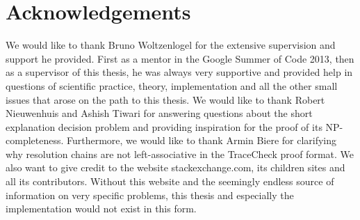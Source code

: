 \chapter*{Acknowledgements}
\vspace*{\fill}

We would like to thank Bruno Woltzenlogel for the extensive supervision and support he provided.
First as a mentor in the Google Summer of Code 2013, then as a supervisor of this thesis, he was always very supportive and provided help in questions of scientific practice, theory, implementation and all the other small issues that arose on the path to this thesis.
We would like to thank Robert Nieuwenhuis and Ashish Tiwari for answering questions about the short explanation decision problem and providing inspiration for the proof of its NP-completeness. Furthermore, we would like to thank Armin Biere for clarifying why resolution chains are not left-associative in the TraceCheck proof format. We also want to give credit to the website stackexchange.com, its children sites and all its contributors. Without this website and the seemingly endless source of information on very specific problems, this thesis and especially the implementation would not exist in this form.
\vspace*{\fill}